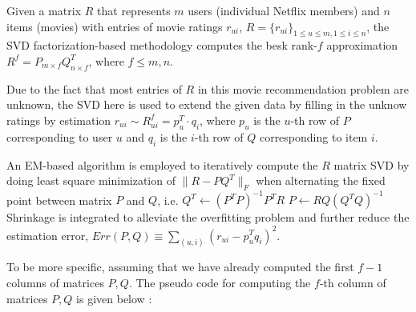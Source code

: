 \documentclass{article}\usepackage{graphicx, color}
\begin{document}
Given a matrix $R$ that represents $m$ users (individual Netflix members) and $n$ items (movies)
with entries of movie ratings $r_{ui}$, $R=\{r_{ui}\}_{1\leq u\leq m, 1\leq i\leq n}$,
the SVD factorization-based methodology computes the besk rank-$f$ approximation
$R^f=P_{m\times f}Q_{n\times f}^T$, where $f\leq m,n$.

Due to the fact that most entries of $R$ in this movie recommendation problem are unknown,
the SVD here is used to extend the given data by filling in the unknow ratings by estimation 
$r_{ui} \sim R_{ui}^f = p_u^T \cdot q_i$, where $p_u$ is the $u$-th row of $P$ corresponding to user $u$
and $q_i$ is the $i$-th row of $Q$ corresponding to item $i$.

An EM-based algorithm is employed to iteratively compute the $R$ matrix SVD by doing
least square minimization of $\|R-PQ^T\|_F$ when alternating the fixed point between
matrix $P$ and $Q$, i.e. \newline
$Q^T \leftarrow (P^TP)^{-1}P^TR$ \newline
$P \leftarrow RQ(Q^TQ)^{-1}$\newline
Shrinkage is integrated to alleviate the overfitting problem and further reduce the estimation error,\newline
$Err(P,Q)\equiv \displaystyle\sum_{(u,i)}(r_{ui}-p_u^Tq_i)^2$.

To be more specific, assuming that we have already computed the first $f-1$ columns of
matrices $P,Q$. The pseudo code for computing the $f$-th column of matrices $P,Q$ is given below
\cite{KDD07}:
\end{document}
